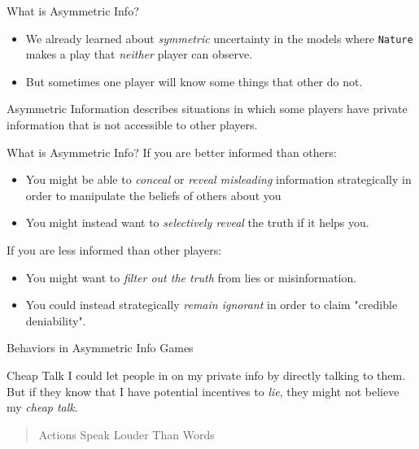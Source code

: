 
\begin{frame}{What is Asymmetric Info?}
  \begin{itemize}
    \item We already learned about \textit{symmetric} uncertainty
    in the models where \texttt{Nature} makes a play
    that \textit{neither} player can observe.
    \item But sometimes one player will know some things that other do not.
  \end{itemize}
  \begin{block}{Asymmetric Information}
    describes situations in which some players have \alert{private information}
    that is not accessible to other players.
  \end{block} 
\end{frame}


\begin{frame}{What is Asymmetric Info?}
  If you are \alert{better informed} than others:
  \begin{itemize}
    \item You might be able to 
    \textit{conceal} or \textit{reveal misleading} information strategically
    in order to manipulate the beliefs of others about you 
    \item You might instead want to \textit{selectively reveal} the truth
    if it helps you.
  \end{itemize}
  If you are \alert{less informed} than other players:
  \begin{itemize}
    \item You might want to \textit{filter out the truth} from lies or misinformation.
    \item You could instead strategically \textit{remain ignorant} 
    in order to claim "credible deniability".
  \end{itemize}
\end{frame}


\begin{frame}{Behaviors in Asymmetric Info Games}
  \begin{block}{Cheap Talk}
    I could let people in on my private info by directly talking to them.
    But if they know that I have potential incentives to \textit{lie},
    they might not believe my \alert{\textit{cheap talk}}.
  \end{block}
  \begin{quote}
    Actions Speak Louder Than Words 
  \end{quote}
\end{frame}

